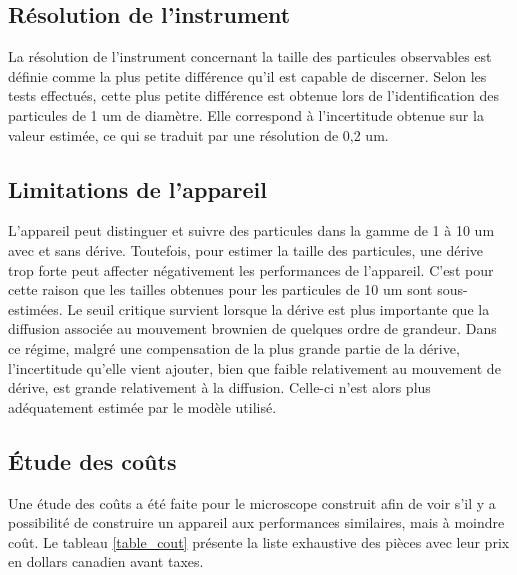 \documentclass[11pt,letterpaper]{article}
\begin{document}
\subsection{Résolution de l'instrument}

La résolution de l'instrument concernant la taille des particules observables est définie
comme la plus petite différence qu'il est capable de discerner. Selon les tests effectués, 
cette plus petite différence est obtenue lors de l'identification des particules de 1 um 
de diamètre. Elle correspond à l'incertitude obtenue sur la valeur estimée, ce qui se traduit
par une résolution de 0,2 um. 

\subsection{Limitations de l'appareil}

L'appareil peut distinguer et suivre des particules dans la gamme de 1 à 10 um avec et sans dérive.
Toutefois, pour estimer la taille des particules, une dérive trop forte peut affecter négativement 
les performances de l'appareil. C'est pour cette raison que les tailles obtenues pour les particules
de 10 um sont sous-estimées. Le seuil critique survient lorsque la dérive est plus importante que la 
diffusion associée au mouvement brownien de quelques ordre de grandeur. Dans ce régime, malgré une 
compensation de la plus grande partie de la dérive, l'incertitude qu'elle vient ajouter, bien que faible
relativement au mouvement de dérive, est grande relativement à la diffusion. Celle-ci n'est alors plus 
adéquatement estimée par le modèle utilisé. 


\subsection{Étude des coûts}

Une étude des coûts a été faite pour le microscope construit afin de voir s'il y a possibilité
de construire un appareil aux performances similaires, mais à moindre coût. Le tableau \ref{table_cout}
présente la liste exhaustive des pièces avec leur prix en dollars canadien avant taxes.
\end{document}
